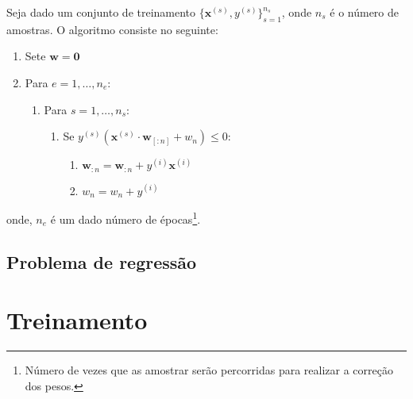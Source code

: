 Seja dado um conjunto de treinamento $\{\pmb{x}^{(s)},y^{(s)}\}_{s=1}^{n_s}$, onde $n_s$ é o número de amostras. O algoritmo consiste no seguinte:
\begin{enumerate}
\item Sete $\pmb{w} = \pmb{0}$
\item Para $e = 1,\dotsc, n_e$:
  \begin{enumerate}
  \item Para $s = 1,\dotsc, n_s$:
    \begin{enumerate}
    \item Se $y^{(s)}(\pmb{x}^{(s)}\cdot \pmb{w}_{[:n]}+w_n) \leq 0$:
      \begin{enumerate}
      \item $\pmb{w}_{:n} = \pmb{w}_{:n}+y^{(i)}\pmb{x}^{(i)}$
      \item $w_n = w_n + y^{(i)}$
      \end{enumerate}
    \end{enumerate}
  \end{enumerate}
\end{enumerate}
onde, $n_e$ é um dado número de épocas\footnote{Número de vezes que as amostrar serão percorridas para realizar a correção dos pesos.}.

\emconstrucao

\subsection{Problema de regressão}

\emconstrucao

\section{Treinamento}

\emconstrucao
